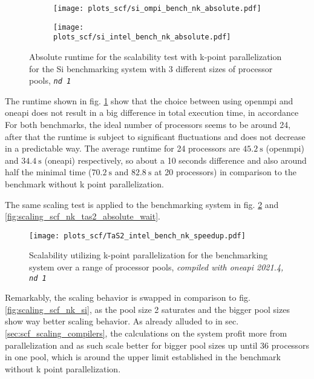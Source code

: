 \documentclass[main.tex]{subfiles}
\begin{document}
\begin{figure}[ht!]
\begin{subfigure}[b]{0.49\textwidth}
    \centering
    \texttt{[image: plots\_scf/si\_ompi\_bench\_nk\_absolute.pdf]}
\end{subfigure}
\begin{subfigure}[b]{0.49\textwidth}
    \centering
    \texttt{[image: plots\_scf/si\_intel\_bench\_nk\_absolute.pdf]}
\end{subfigure}
\caption{Absolute runtime for the scalability test with k-point parallelization for the Si benchmarking system with 3 different sizes of processor pools, \emph{\texttt{nd 1}}}
\label{fig:scaling_scf_nk_si_absolute}
\end{figure}
The runtime shown in fig. \ref{fig:scaling_scf_nk_si_absolute} show that the choice between using \gls{openmpi} and \gls{oneapi} does not result in a big difference in total execution time, in accordance
For both benchmarks, the ideal number of processors seems to be around 24, after that the runtime is subject to significant fluctuations and does not decrease in a predictable way.
The average runtime for 24 processors are \(\SI{45.2}{\second}\) (\gls{openmpi}) and \(\SI{34.4}{\second}\) (\gls{oneapi}) respectively, so about a 10 seconds difference and also around half the minimal time (\(\SI{70.2}{\second}\) and \(\SI{82.8}{\second}\) at 20 processors) in comparison to the benchmark without k point parallelization.

The same scaling test is applied to the \TaS benchmarking system in fig. \ref{fig:scaling_scf_nk_tas2} and \ref{fig:scaling_scf_nk_tas2_absolute_wait}.

\begin{figure}[ht!]
    \centering
    \texttt{[image: plots\_scf/TaS2\_intel\_bench\_nk\_speedup.pdf]}
    \caption{Scalability utilizing k-point parallelization for the \TaS benchmarking system over a range of processor pools, \emph{\QE compiled with \gls{oneapi} 2021.4, \texttt{nd 1}}}
    \label{fig:scaling_scf_nk_tas2}
\end{figure}
Remarkably, the scaling behavior is swapped in comparison to fig. \ref{fig:scaling_scf_nk_si}, as the pool size 2 saturates and the bigger pool sizes show way better scaling behavior.
As already alluded to in sec. \ref{sec:scf_scaling_compilers}, the calculations on the \TaS system profit more from parallelization and as such scale better for bigger pool sizes up until 36 processors in one pool, which is around the upper limit established in the benchmark without k point parallelization.
\end{document}
